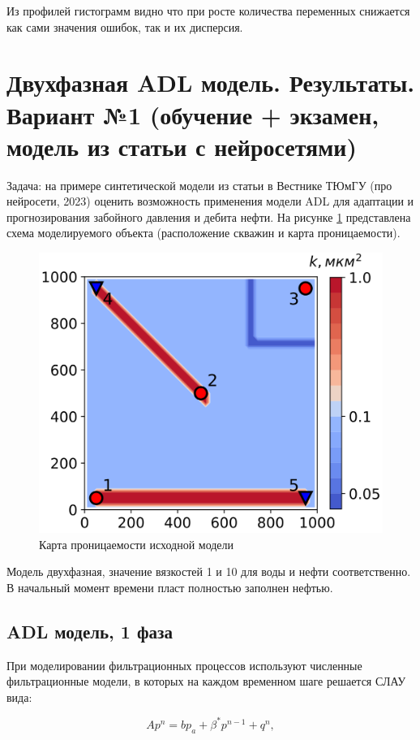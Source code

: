 \documentclass[14pt]{article}
\begin{document}
Из профилей гистограмм видно что при росте количества переменных снижается как сами значения ошибок, так и их дисперсия. 

	\newpage

\section{Двухфазная ADL модель. Результаты. Вариант №1 (обучение + экзамен, модель из статьи с нейросетями)}
Задача: на примере синтетической модели из статьи в Вестнике ТЮмГУ (про нейросети, 2023) оценить возможность применения модели ADL для адаптации и прогнозирования забойного давления и дебита нефти. На рисунке \ref{fig:map_init_perm} представлена схема моделируемого объекта (расположение скважин и карта проницаемости). 
\begin{figure}
	\centering
	\includegraphics[width=0.9\linewidth]{fig1.png}
	\caption{Карта проницаемости исходной модели}
	\label{fig:map_init_perm}
\end{figure}

Модель двухфазная, значение вязкостей 1 и 10 для воды и нефти соответственно. В начальный момент времени пласт полностью заполнен нефтью. 

\subsection{ADL модель, 1 фаза}
При моделировании фильтрационных процессов используют численные фильтрационные модели, в которых на каждом временном шаге решается СЛАУ вида: 

\begin{equation} \label{eq01}
	Ap^n=bp_a + \beta^*p^{n-1} + q^n,
\end{equation}
\end{document}

